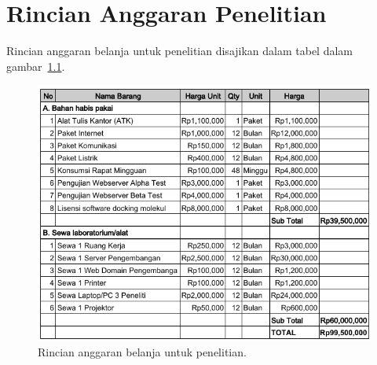 \chapter{Rincian Anggaran Penelitian}


Rincian anggaran belanja untuk penelitian disajikan dalam tabel dalam gambar~\ref{fig:rab}.

\begin{figure}
	\centering
	\includegraphics[scale=0.85, angle=0]{pics/rab.png}
 	\caption{Rincian anggaran belanja untuk penelitian.}
  	\label{fig:rab}
\end{figure}  